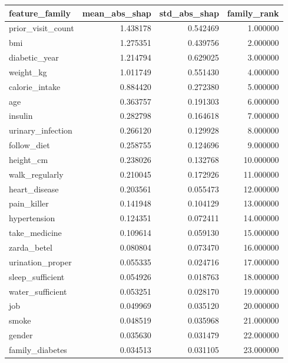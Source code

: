 \begin{tabular}{lrrr}
\toprule
feature\_family & mean\_abs\_shap & std\_abs\_shap & family\_rank \\
\midrule
prior\_visit\_count & 1.438178 & 0.542469 & 1.000000 \\
bmi & 1.275351 & 0.439756 & 2.000000 \\
diabetic\_year & 1.214794 & 0.629025 & 3.000000 \\
weight\_kg & 1.011749 & 0.551430 & 4.000000 \\
calorie\_intake & 0.884420 & 0.272380 & 5.000000 \\
age & 0.363757 & 0.191303 & 6.000000 \\
insulin & 0.282798 & 0.164618 & 7.000000 \\
urinary\_infection & 0.266120 & 0.129928 & 8.000000 \\
follow\_diet & 0.258755 & 0.124696 & 9.000000 \\
height\_cm & 0.238026 & 0.132768 & 10.000000 \\
walk\_regularly & 0.210045 & 0.172926 & 11.000000 \\
heart\_disease & 0.203561 & 0.055473 & 12.000000 \\
pain\_killer & 0.141948 & 0.104129 & 13.000000 \\
hypertension & 0.124351 & 0.072411 & 14.000000 \\
take\_medicine & 0.109614 & 0.059130 & 15.000000 \\
zarda\_betel & 0.080804 & 0.073470 & 16.000000 \\
urination\_proper & 0.055335 & 0.024716 & 17.000000 \\
sleep\_sufficient & 0.054926 & 0.018763 & 18.000000 \\
water\_sufficient & 0.053251 & 0.028170 & 19.000000 \\
job & 0.049969 & 0.035120 & 20.000000 \\
smoke & 0.048519 & 0.035968 & 21.000000 \\
gender & 0.035630 & 0.031479 & 22.000000 \\
family\_diabetes & 0.034513 & 0.031105 & 23.000000 \\
\bottomrule
\end{tabular}
